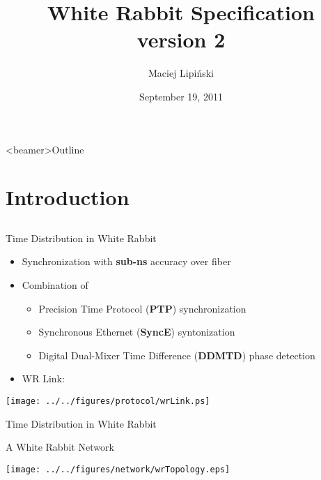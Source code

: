 \documentclass[compress,red]{beamer}
\title[White Rabbit Specification\hspace{2em}\insertframenumber/ \inserttotalframenumber]
{White Rabbit Specification \\ version 2}
\institute{
$5^{th}$ White Rabbit Workshop \\ CERN
}
\author{
Maciej Lipi\'{n}ski %
}
\date{September 19, 2011}
\begin{document}
\frame{\titlepage}
\begin{frame}<beamer>{Outline}

    \tableofcontents %

\end{frame}
\section{Introduction}
\subsection{}
\begin{frame}{Time Distribution in White Rabbit}

  \begin{itemize}
    \item Synchronization with {\bf sub-ns} accuracy over fiber
    \item Combination of
	\begin{itemize}
	  \item Precision Time Protocol ({\bf PTP}) synchronization
	  \item Synchronous Ethernet ({\bf SyncE}) syntonization
	  \item Digital Dual-Mixer Time Difference ({\bf DDMTD}) phase detection
	\end{itemize}
    \item WR Link:
  \end{itemize}

  \begin{center}
  \texttt{[image: ../../figures/protocol/wrLink.ps]}
  \end{center}

\end{frame}
\begin{frame}{Time Distribution in White Rabbit}

\center A White Rabbit Network
  \begin{center}
  \texttt{[image: ../../figures/network/wrTopology.eps]}
  \end{center}
\end{frame}
\end{document}
